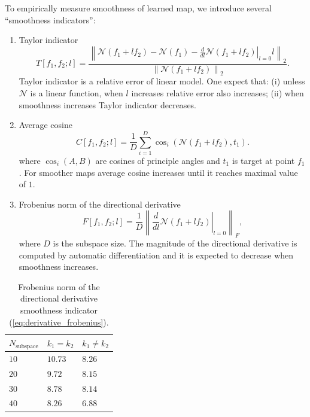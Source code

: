 \documentclass{article}
\begin{document}
To empirically measure smoothness of learned map, we introduce several ``smoothness indicators'':
\begin{enumerate}
	\item Taylor indicator 
	\begin{equation}
		\label{eq:taylor_smoothness}
		T[f_1, f_2; l] = \frac{\left\|\mathcal{N}(f_1 + l f_2) -  \mathcal{N}(f_1) - \left.\frac{d}{dl} \mathcal{N}(f_1 + l f_2)\right|_{l=0}l\right\|_2}{\left\|\mathcal{N}(f_1 + l f_2)\right\|_2}.
	\end{equation}
	Taylor indicator is a relative error of linear model. One expect that: (i) unless $\mathcal{N}$ is a linear function, when $l$ increases relative error also increases; (ii) when smoothness increases Taylor indicator decreases.
	\item Average cosine
	\begin{equation}
		\label{eq:average_cosines}
		C[f_1, f_2;l] = \frac{1}{D}\sum_{i=1}^{D} \cos_{i}(\mathcal{N}(f_1 + l f_2), t_1).
	\end{equation}
	where $\cos_i(A, B)$ are cosines of principle angles \cite{bjorck1973numerical} and $t_1$ is target at point $f_1$. For smoother maps average cosine increases until it reaches maximal value of $1$.
	\item Frobenius norm of the directional derivative
	\begin{equation}
		\label{eq:derivative_frobenius}
		F[f_1, f_2; l] = \frac{1}{D}\left\|\left.\frac{d}{dl} \mathcal{N}(f_1 + l f_2)\right|_{l=0}\right\|_F,
	\end{equation}
	where $D$ is the subspace size. The magnitude of the directional derivative is computed by automatic differentiation and it is expected to decrease when smoothness increases.
\end{enumerate}

\begin{table}
\caption{Frobenius norm of the directional derivative smoothness indicator (\ref{eq:derivative_frobenius}).}
\label{table:derivative_smoothness}
\begin{center}
\begin{tabular}{lll}
\toprule
$N_{\text{subspace}}$ & $k_1=k_2$ & $k_1\neq k_2$ \\
\midrule
$10$ & $10.73$ & $8.26$\\
$20$ & $9.72$ & $8.15$\\
$30$ & $8.78$ & $8.14$\\
$40$ & $8.26$ & $6.88$\\
\bottomrule
\end{tabular}
\end{center}
\end{table}
\end{document}
